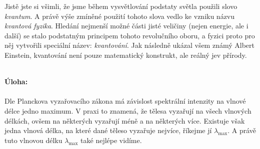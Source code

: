 \documentclass{../../../../style/mkimain}
\begin{document}
Jistě jste si všimli, že jsme během vysvětlování podstaty světla použili slovo \textit{kvantum}.
A právě výše zmíněné použití tohoto slova vedlo ke vzniku názvu \textit{kvantová fyzika}.
Hledání nejmenší možné části jisté veličiny (nejen energie, ale i další) se stalo podstatným principem tohoto revolučního oboru,
a fyzici proto pro něj vytvořili speciální název: \textit{kvantování}.
Jak následně ukázal všem známý Albert Einstein, kvantování není pouze matematický konstrukt, ale reálný jev přírody.
\\
\\
\begin{center}
\end{center}
\textbf{Úloha:}
\\
\\
Dle Planckova vyzařovacího zákona má závislost spektrální intenzity na vlnové délce jedno maximum.
V praxi to znamená, že tělesa vyzařují na všech vlnových délkách, ovšem na některých vyzařují méně a na některých více.
Existuje však jedna vlnová délka, na které dané těleso vyzařuje nejvíce, říkejme jí $\lambda_\mathrm{max}$.
A právě tuto vlnovou délku $\lambda_\mathrm{max}$ také nejlépe vidíme.
\end{document}
